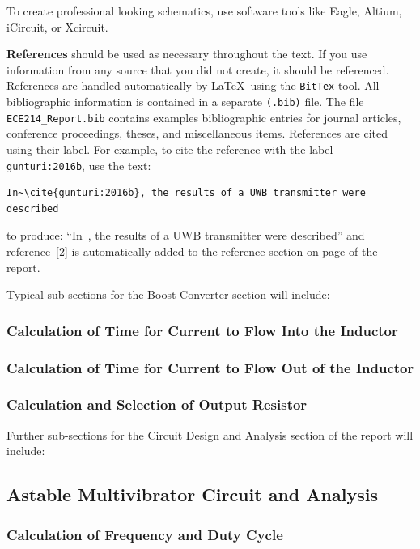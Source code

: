 \documentclass[11pt]{article}
\begin{document}
To create professional looking schematics, use software tools like Eagle, Altium, iCircuit, or Xcircuit. 

\textbf{References} should be used as necessary throughout the text. If you use information from any source that you did not create, it should be referenced. References are handled automatically by \LaTeX\ using the {\tt BitTex} tool. All bibliographic information is contained in a separate {\tt(.bib)} file. The file {\tt ECE214\_Report.bib} contains examples bibliographic entries for journal articles, conference proceedings, theses, and miscellaneous items. References are cited using their label. For example, to cite the reference with the label {\tt gunturi:2016b}, use the text: 
\vspace{-3mm}
\begin{verbatim}
In~\cite{gunturi:2016b}, the results of a UWB transmitter were described
\end{verbatim}
to produce:  ``In~\cite{gunturi:2016b}, the results of a UWB transmitter were described'' and reference~[2] is automatically added to the reference section on page \pageref{LastPage} of the report.  

Typical sub-sections for the Boost Converter section will include: 
\subsubsection{Calculation of Time for Current to Flow Into the Inductor}

\subsubsection{Calculation of Time for Current to Flow Out of the Inductor}

\subsubsection{Calculation and Selection of Output Resistor}

Further sub-sections for the Circuit Design and Analysis section of the report will include:

\subsection{Astable Multivibrator Circuit and Analysis}

\subsubsection{Calculation of Frequency and Duty Cycle}
\end{document}

